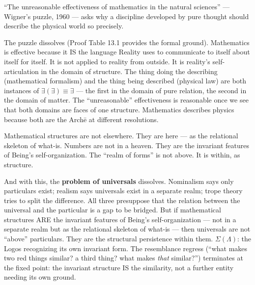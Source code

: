 \documentclass[10pt, openany, oneside]{book}
\begin{document}
\vspace{1em}

\noindent ``The unreasonable effectiveness of mathematics in the natural sciences'' --- Wigner's puzzle, 1960 --- asks why a discipline developed by pure thought should describe the physical world so precisely.

The puzzle dissolves (Proof Table 13.1 provides the formal ground). Mathematics is effective because it IS the language Reality uses to communicate to itself about itself for itself. It is not applied to reality from outside. It is reality's self-articulation in the domain of structure. The thing doing the describing (mathematical formalism) and the thing being described (physical law) are both instances of $\exists(\exists) \equiv \exists$ --- the first in the domain of pure relation, the second in the domain of matter. The ``unreasonable'' effectiveness is reasonable once we see that both domains are faces of one structure. Mathematics describes physics because both are the Arch\={e} at different resolutions.

Mathematical structures are not elsewhere. They are here --- as the relational skeleton of what-is. Numbers are not in a heaven. They are the invariant features of Being's self-organization. The ``realm of forms'' is not above. It is within, as structure.

And with this, the \textbf{problem of universals} dissolves. Nominalism says only particulars exist; realism says universals exist in a separate realm; trope theory tries to split the difference. All three presuppose that the relation between the universal and the particular is a gap to be bridged. But if mathematical structures ARE the invariant features of Being's self-organization --- not in a separate realm but as the relational skeleton of what-is --- then universals are not ``above'' particulars. They are the structural persistence within them. $\Sigma(\Lambda)$: the Logos recognizing its own invariant form. The resemblance regress (``what makes two red things similar? a third thing? what makes \textit{that} similar?'') terminates at the fixed point: the invariant structure IS the similarity, not a further entity needing its own ground.
\end{document}
